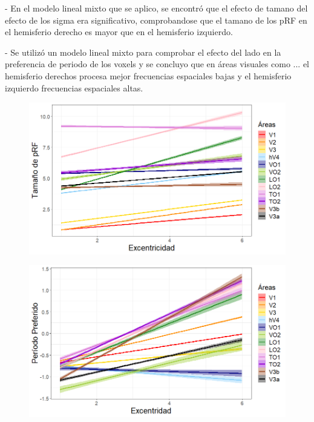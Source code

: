 - En el modelo lineal mixto que se aplico, se encontr\'o que el efecto de tamano del efecto de los sigma era significativo, comprobandose que el tamano de los pRF en el hemisferio derecho es mayor que en el hemisferio izquierdo.

- Se utiliz\'o un modelo lineal mixto para comprobar el efecto del lado en la preferencia de periodo de los voxels y se concluyo que en \'areas visuales como ... el hemisferio derechos procesa mejor frecuencias espaciales bajas y el hemisferio izquierdo frecuencias espaciales altas.


\begin{figure}
	\centering		
	\includegraphics[scale=0.8]{../images/sigma_vs_eccen_all_rois}
	\label{fig:sigma_vs_eccen}
\end{figure}

\begin{figure}
	\centering		
	\includegraphics[scale=0.8]{Graphics/pp_vs_eccen_all_rois}
	\label{fig:pp_vs_eccen}
\end{figure}


